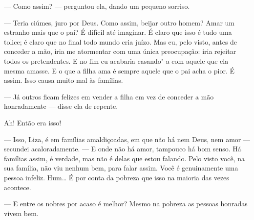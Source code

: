 --- Como assim? --- perguntou ela, dando um pequeno sorriso.

--- Teria ciúmes, juro por Deus. Como assim, beijar outro homem? Amar um
estranho mais que o pai? É difícil até imaginar. É claro que isso é
tudo uma tolice; é claro que no final todo mundo cria juízo. Mas eu,
pelo visto, antes de conceder a mão, iria me atormentar com uma única
preocupação: iria rejeitar todos os pretendentes. E no fim eu acabaria
casando"-a com aquele que ela mesma amasse. E o que a filha ama é sempre
aquele que o pai acha o pior. É assim. Isso causa muito mal às
famílias.

--- Já outros ficam felizes em vender a filha em vez de conceder a mão
honradamente --- disse ela de repente.

Ah! Então era isso!

--- Isso, Liza, é em famílias amaldiçoadas, em que não há nem Deus, nem
amor --- secundei acaloradamente. --- E onde não há amor, tampouco há bom
senso. Há famílias assim, é verdade, mas não é delas que estou falando.
Pelo visto você, na sua família, não viu nenhum bem, para falar
assim. Você é genuinamente uma pessoa infeliz. Hum\ldots{} É por conta da
pobreza que isso na maioria das vezes acontece.

--- E entre os nobres por acaso é melhor? Mesmo na pobreza as pessoas
honradas vivem bem.

